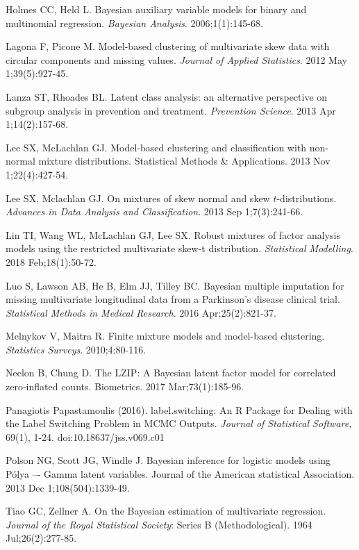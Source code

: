 \documentclass[useAMS,referee]{biom}
\begin{document}
\begin{thebibliography}{}
\bibitem{ } Holmes CC, Held L. Bayesian auxiliary variable models for binary and multinomial regression. \textit{Bayesian Analysis}. 2006;1(1):145-68.

\bibitem{ } Lagona F, Picone M. Model-based clustering of multivariate skew data with circular components and missing values. \textit{Journal of Applied Statistics}. 2012 May 1;39(5):927-45.

\bibitem{ } Lanza ST, Rhoades BL. Latent class analysis: an alternative perspective on subgroup analysis in prevention and treatment. \textit{Prevention Science}. 2013 Apr 1;14(2):157-68.

\bibitem{ } Lee SX, McLachlan GJ. Model-based clustering and classification with non-normal mixture distributions. Statistical Methods \& Applications. 2013 Nov 1;22(4):427-54.

\bibitem{ } Lee SX, Mclachlan GJ. On mixtures of skew normal and skew $t$-distributions. \textit{Advances in Data Analysis and Classification}. 2013 Sep 1;7(3):241-66.

\bibitem{ } Lin TI, Wang WL, McLachlan GJ, Lee SX. Robust mixtures of factor analysis models using the restricted multivariate skew-t distribution. \textit{Statistical Modelling}. 2018 Feb;18(1):50-72.

\bibitem{ } Luo S, Lawson AB, He B, Elm JJ, Tilley BC. Bayesian multiple imputation for missing multivariate longitudinal data from a Parkinson's disease clinical trial. \textit{Statistical Methods in Medical Research}. 2016 Apr;25(2):821-37.

\bibitem{ } Melnykov V, Maitra R. Finite mixture models and model-based clustering. \textit{Statistics Surveys}. 2010;4:80-116.

\bibitem{ } Neelon B, Chung D. The LZIP: A Bayesian latent factor model for correlated zero‐inflated counts. Biometrics. 2017 Mar;73(1):185-96.

\bibitem{ } Panagiotis Papastamoulis (2016). label.switching: An R Package for Dealing with the Label Switching Problem in MCMC Outputs. \textit{Journal of Statistical Software}, 69(1), 1-24. doi:10.18637/jss.v069.c01

\bibitem{ } Polson NG, Scott JG, Windle J. Bayesian inference for logistic models using P\'olya –- Gamma latent variables. Journal of the American statistical Association. 2013 Dec 1;108(504):1339-49.

\bibitem{ } Tiao GC, Zellner A. On the Bayesian estimation of multivariate regression. \textit{Journal of the Royal Statistical Society}: Series B (Methodological). 1964 Jul;26(2):277-85.


\end{thebibliography}
\end{document}
